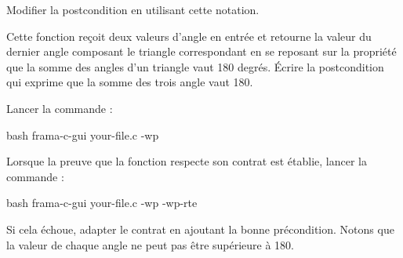 Modifier la postcondition en utilisant cette notation.




Cette fonction reçoit deux valeurs d'angle en entrée et retourne
la valeur du dernier angle composant le triangle correspondant en se
reposant sur la propriété que la somme des angles d'un triangle vaut
180 degrés. Écrire la postcondition qui exprime que la somme des trois
angle vaut 180.




Lancer la commande :


\begin{CodeBlock}{bash}
frama-c-gui your-file.c -wp
\end{CodeBlock}


Lorsque la preuve que la fonction respecte son contrat est établie, lancer
la commande :

\begin{CodeBlock}{bash}
frama-c-gui your-file.c -wp -wp-rte
\end{CodeBlock}


Si cela échoue, adapter le contrat en ajoutant la bonne précondition.
Notons que la valeur de chaque angle ne peut pas être supérieure à 180.
